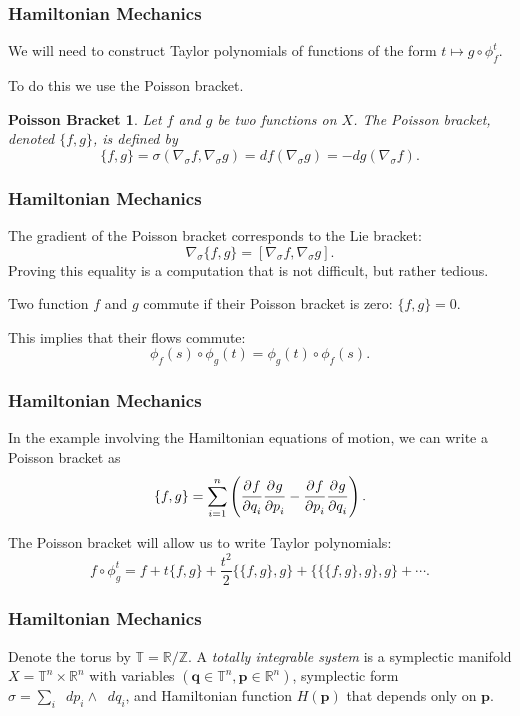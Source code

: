 \documentclass{beamer}
\newcommand{\Z}{\mathbb{Z}}
\newcommand{\R}{\mathbb{R}}
\newcommand{\bp}[1]{\bm{#1}}
\newcommand{\sgrad}{\nabla_{\sigma}}
\newcommand{\dif}{\mathop{}\!{d}}
\newcommand\pd[3][]{\frac{\strut\partial^{#1}#2}{\strut\partial#3^{#1}}}
\begin{document}
\begin{frame}
  \frametitle{Hamiltonian Mechanics}
  We will need to construct Taylor polynomials of functions of the form $t
  \mapsto g \circ \phi^t_f$.

  To do this we use the Poisson bracket.
  \newtheorem{possbrack}{Poisson Bracket}
  \begin{possbrack}
    Let $f$ and $g$ be two functions on $X$.
    The \emph{Poisson bracket}, denoted $\{f, g\}$, is defined by
    \begin{equation*}
      \{f, g\} = \sigma(\sgrad f, \sgrad g) = df(\sgrad g) = - dg(\sgrad f).
    \end{equation*}
  \end{possbrack}
\end{frame}

\begin{frame}
  \frametitle{Hamiltonian Mechanics}
  The gradient of the Poisson bracket corresponds to the Lie bracket:
  \begin{equation*}
    \sgrad \{f, g\} = [\sgrad f, \sgrad g].
  \end{equation*}
  Proving this equality is a computation that is not difficult, but rather
  tedious.

  Two function $f$ and $g$ commute if their Poisson bracket is zero: $\{f, g\} =
  0$.

  This implies that their flows commute:
  \begin{equation*}
    \phi_f(s) \circ \phi_g(t) = \phi_g(t) \circ \phi_f(s).
  \end{equation*}
\end{frame}

\begin{frame}
  \frametitle{Hamiltonian Mechanics}
  In the example involving the Hamiltonian equations of motion, we can write a
  Poisson bracket as
  \begin{equation*}
    \{f, g\} = \sum_{i = 1}^n \left( \pd{f}{q_i} \pd{g}{p_i} - \pd{f}{p_i}
      \pd{g}{q_i}\right).
  \end{equation*}

  The Poisson bracket will allow us to write Taylor polynomials:
  \begin{equation*}
    f \circ \phi^t_g = f + t \{f, g\} + \frac{t^2}{2} \{\{f,g\},g\} +
    \{\{\{f,g\},g\},g\} + \cdots.
  \end{equation*}
\end{frame}

\begin{frame}
  \frametitle{Hamiltonian Mechanics}
  Denote the torus by $\mathbb{T} = \R / \Z$.
  A \emph{totally integrable system} is a symplectic manifold $X = \mathbb{T}^n
  \times \R^n$ with variables $(\bp{q} \in \mathbb{T}^n, \bp{p} \in \R^n)$,
  symplectic form $\sigma = \sum_i \dif p_i \wedge \dif q_i$, and Hamiltonian
  function $H(\bp{p})$ that depends only on $\bp{p}$.
\end{frame}
\end{document}
